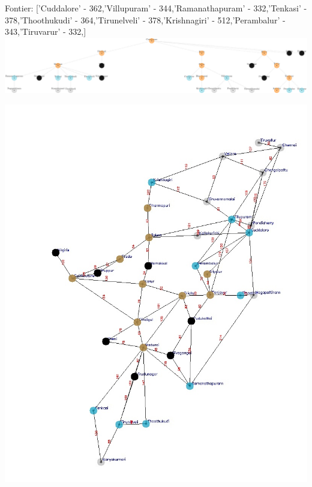 \documentclass[xcolor=table]{beamer}
\begin{document}
\begin{frame}
  { \tiny Fontier: ['Cuddalore' - 362,'Villupuram' - 344,'Ramanathapuram' - 332,'Tenkasi' - 378,'Thoothukudi' - 364,'Tirunelveli' - 378,'Krishnagiri' - 512,'Perambalur' - 343,'Tiruvarur' - 332,]}
  \includegraphics[width=1\textwidth]{../UCSNodes/26-1.png}
  \begin{center}
    \includegraphics[height=0.6\textheight]{../UCSoutput/tamilUCS24.jpg}
  \end{center}
\end{frame}
\end{document}
